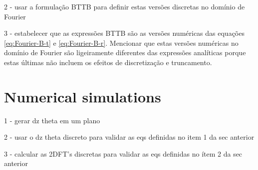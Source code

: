 2 - usar a formulação BTTB para definir estas versões discretas no domínio de Fourier

3 - estabelecer que as expressões BTTB são as versões numéricas das equações 
\ref{eq:Fourier-B-t} e \ref{eq:Fourier-B-r}. Mencionar que estas versões numéricas 
no domínio de Fourier são ligeiramente diferentes das expressões analíticas porque
estas últimas não incluem os efeitos de discretização e truncamento.

\section{Numerical simulations}
\label{sec:numerical_simulations}

1 - gerar dz theta em um plano

2 - usar o dz theta discreto para validar as eqs definidas no item 1 da sec anterior

3 - calcular as 2DFT's discretas para validar as eqs definidas no ítem 2 da sec anterior


